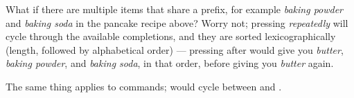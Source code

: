 		What if there are multiple items that share a prefix, for example \emph{baking powder} and \emph{baking soda} in the pancake recipe above? Worry not; pressing  \emph{repeatedly} will cycle through the available completions, and they are sorted lexicographically (length, followed by alphabetical order) --- pressing  after  would give you \emph{butter}, \emph{baking powder}, and \emph{baking soda}, in that order, before giving you \emph{butter} again.

		The same thing applies to commands;  would cycle between  and .







